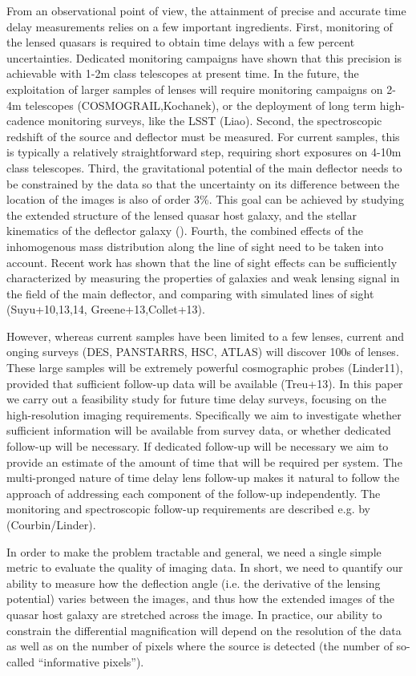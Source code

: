 \documentclass[a4paper,11pt]{article}
\begin{document}
From an observational point of view, the attainment of precise and
accurate time delay measurements relies on a few important
ingredients. First, monitoring of the lensed quasars is required to
obtain time delays with a few percent uncertainties. Dedicated
monitoring campaigns have shown that this precision is achievable with
1-2m class telescopes at present time. In the future, the exploitation
of larger samples of lenses will require monitoring campaigns on 2-4m
telescopes (COSMOGRAIL,Kochanek), or the deployment of long term
high-cadence monitoring surveys, like the LSST (Liao). Second, the
spectroscopic redshift of the source and deflector must be
measured. For current samples, this is typically a relatively
straightforward step, requiring short exposures on 4-10m class
telescopes.  Third, the gravitational potential of the main deflector
needs to be constrained by the data so that the uncertainty on its
difference between the location of the images is also of order
3\%. This goal can be achieved by studying the extended structure of
the lensed quasar host galaxy, and the stellar kinematics of the
deflector galaxy (). Fourth, the combined effects of the inhomogenous
mass distribution along the line of sight need to be taken into
account. Recent work has shown that the line of sight effects can be
sufficiently characterized by measuring the properties of galaxies and
weak lensing signal in the field of the main deflector, and comparing
with simulated lines of sight (Suyu+10,13,14, Greene+13,Collet+13).

However, whereas current samples have been limited to a few lenses,
current and onging surveys (DES, PANSTARRS, HSC, ATLAS) will discover
100s of lenses. These large samples will be extremely powerful
cosmographic probes (Linder11), provided that sufficient follow-up
data will be available (Treu+13). In this paper we carry out a
feasibility study for future time delay surveys, focusing on the
high-resolution imaging requirements. Specifically we aim to
investigate whether sufficient information will be available from
survey data, or whether dedicated follow-up will be necessary. If
dedicated follow-up will be necessary we aim to provide an estimate of
the amount of time that will be required per system. The multi-pronged
nature of time delay lens follow-up makes it natural to follow the
approach of addressing each component of the follow-up
independently. The monitoring and spectroscopic follow-up requirements
are described e.g. by (Courbin/Linder).

In order to make the problem tractable and general, we need a single
simple metric to evaluate the quality of imaging data. In short, we
need to quantify our ability to measure how the deflection angle
(i.e. the derivative of the lensing potential) varies between the
images, and thus how the extended images of the quasar host galaxy are
stretched across the image. In practice, our ability to constrain the
differential magnification will depend on the resolution of the data
as well as on the number of pixels where the source is detected (the
number of so-called ``informative pixels''). 
\end{document}
